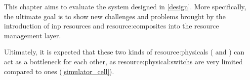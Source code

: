 This chapter aims to evaluate the system designed in \autoref{design}.
More specifically, the ultimate goal is to show new challenges and problems brought by the introduction of \gls{inp} resources and \glspl{resource:composite} into the resource management layer.

Ultimately, it is expected that these two kinds of \glspl{resource:physical} ( and ) can act as a bottleneck for each other, as \glspl{resource:physical:switch} are very limited compared to  ones (\autoref{simulator_cell}).
